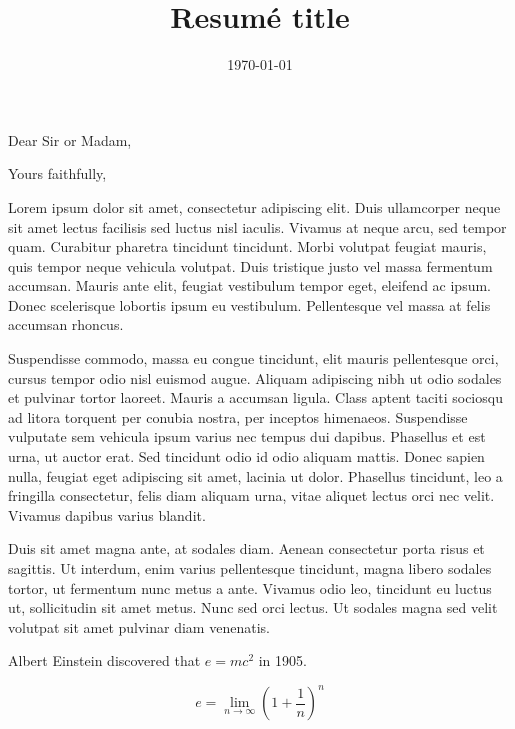 \documentclass[11pt,a4paper,sans,spanish]{mymoderncv}
\title{Resum\'e title}%
\begin{document}

\date{\today}
\opening{Dear Sir or Madam,}
\closing{Yours faithfully,}
{}%
\makelettertitle

Lorem ipsum dolor sit amet, consectetur adipiscing elit. Duis ullamcorper neque sit amet lectus facilisis sed luctus nisl iaculis. Vivamus at neque arcu, sed tempor quam. Curabitur pharetra tincidunt tincidunt. Morbi volutpat feugiat mauris, quis tempor neque vehicula volutpat. Duis tristique justo vel massa fermentum accumsan. Mauris ante elit, feugiat vestibulum tempor eget, eleifend ac ipsum. Donec scelerisque lobortis ipsum eu vestibulum. Pellentesque vel massa at felis accumsan rhoncus.

Suspendisse commodo, massa eu congue tincidunt, elit mauris pellentesque orci, cursus tempor odio nisl euismod augue. Aliquam adipiscing nibh ut odio sodales et pulvinar tortor laoreet. Mauris a accumsan ligula. Class aptent taciti sociosqu ad litora torquent per conubia nostra, per inceptos himenaeos. Suspendisse vulputate sem vehicula ipsum varius nec tempus dui dapibus. Phasellus et est urna, ut auctor erat. Sed tincidunt odio id odio aliquam mattis. Donec sapien nulla, feugiat eget adipiscing sit amet, lacinia ut dolor. Phasellus tincidunt, leo a fringilla consectetur, felis diam aliquam urna, vitae aliquet lectus orci nec velit. Vivamus dapibus varius blandit.

Duis sit amet magna ante, at sodales diam. Aenean consectetur porta risus et sagittis. Ut interdum, enim varius pellentesque tincidunt, magna libero sodales tortor, ut fermentum nunc metus a ante. Vivamus odio leo, tincidunt eu luctus ut, sollicitudin sit amet metus. Nunc sed orci lectus. Ut sodales magna sed velit volutpat sit amet pulvinar diam venenatis.

Albert Einstein discovered that $e=mc^2$ in 1905.

\[ e=\lim_{n \to \infty} \left(1+\frac{1}{n}\right)^n \]

\makeletterclosing

\end{document}
